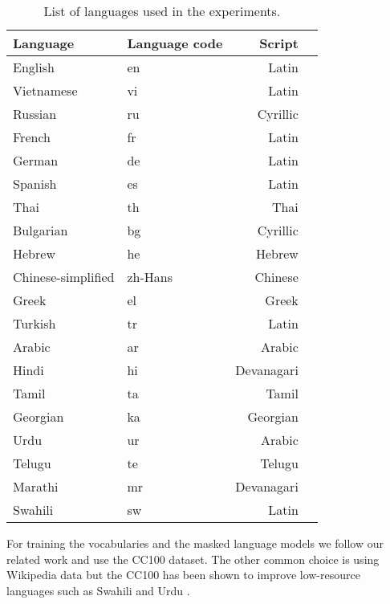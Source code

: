 \begin{table}
    \centering\footnotesize\sf
    \begin{tabular}{llrl}
    \toprule
    Language & Language code & Script \\
    \midrule
    English & en & Latin \\
    Vietnamese & vi & Latin \\
    Russian & ru & Cyrillic \\
    French & fr & Latin \\
    German & de & Latin \\
    Spanish & es & Latin \\
    Thai & th & Thai \\
    Bulgarian & bg & Cyrillic \\
    Hebrew & he & Hebrew \\
    Chinese-simplified & zh-Hans & Chinese \\
    Greek & el & Greek \\
    Turkish & tr & Latin \\
    Arabic & ar & Arabic \\
    Hindi & hi & Devanagari \\
    Tamil & ta & Tamil \\
    Georgian & ka & Georgian \\
    Urdu & ur & Arabic \\
    Telugu & te & Telugu \\
    Marathi & mr & Devanagari \\
    Swahili & sw & Latin \\
    \bottomrule
    \end{tabular}
    \caption{List of languages used in the experiments. }
    \label{tab:languages}
\end{table}

For training the vocabularies and the masked language models we follow our related work \cite{conneau_unsupervised_2020,chung_improving_2020,liang_xlm-v_2023} and use the CC100 dataset. The other common choice is using Wikipedia data \cite{devlin_bert_2019,zheng_allocating_2021} but the CC100 has been shown to improve low-resource languages such as Swahili and Urdu \cite{conneau_unsupervised_2020}.

